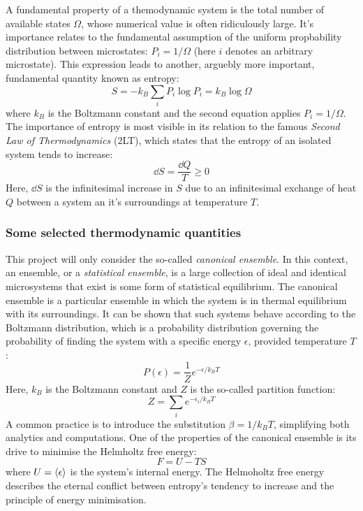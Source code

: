 \documentclass[nofootinbib,reprint,english]{revtex4-1}
\begin{document}
A fundamental property of a themodynamic system is the total number of available states \(\Omega\), whose numerical value is often ridiculously large.  It's importance relates to the fundamental assumption of the uniform propbability distribution between microstates: \(P_i=1/\Omega\) (here \(i\) denotes an arbitrary microstate). This expression leads to another, arguebly more important, fundamental quantity known as entropy:
\begin{equation}\label{eq:Entropy}
S=-k_B\sum_iP_i\log P_i=k_B\log\Omega
\end{equation}
where \(k_B\) is the Boltzmann constant and the second equation applies \(P_i=1/\Omega\). The importance of entropy is most visible in its relation to the famous \emph{Second Law of Thermodynamics} (2LT), which states that the entropy of an isolated system tends to increase:
\begin{equation}\label{eq:Second_Law_of_Thermodynamics}
\dd{S}=\frac{\dd{Q}}{T}\geq0
\end{equation}
Here, \(\dd{S}\) is the infinitesimal increase in \(S\) due to an infinitesimal exchange of heat \(Q\) between a system an it's surroundings at temperature \(T\).
\subsubsection{Some selected thermodynamic quantities}
This project will only consider the so-called \emph{canonical ensemble}. In this context, an ensemble, or a \emph{statistical ensemble}, is a large collection of ideal and identical microsystems that exist is some form of statistical equilibrium. The canonical ensemble is a particular ensemble in which the system is in thermal equilibrium with its surroundings. It can be shown that such systems behave according to the Boltzmann distribution, which is a probability distribution governing the probability of finding the system with a specific energy \(\epsilon\), provided temperature \(T\):
\begin{equation}\label{eq:Boltzmann_Distribution}
P(\epsilon)=\frac{1}{Z}e^{-\epsilon/k_BT}
\end{equation}
Here, \(k_B\) is the Boltzmann constant and \(Z\) is the so-called partition function:
\begin{equation}\label{eq:Partition_Function}
Z=\sum_ie^{-\epsilon_i/k_BT}
\end{equation}
A common practice is to introduce the substitution \(\beta=1/k_BT\), simplifying both analytics and computations. One of the properties of the canonical ensemble is its drive to minimise the Helmholtz free energy:
\begin{equation}\label{eq:Helmholtz_Free_Energy}
F=U-TS
\end{equation}
where \(U=\expval{\epsilon}\) is the system's internal energy. The Helmoholtz free energy describes the eternal conflict between entropy's tendency to increase and the principle of energy minimisation.
\end{document}
